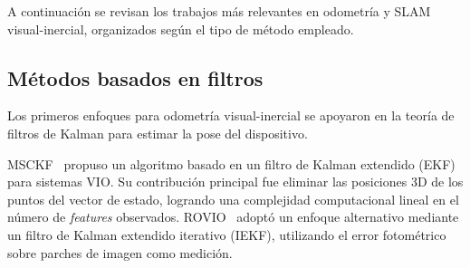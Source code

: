 


A continuación se revisan los trabajos más relevantes en odometría y SLAM visual-inercial, organizados según el tipo de método empleado.

\subsection{Métodos basados en filtros}

Los primeros enfoques para odometría visual-inercial se apoyaron en la teoría de filtros de Kalman para estimar la pose del dispositivo.

MSCKF~\cite{mourikis2007msckf} propuso un algoritmo basado en un filtro de Kalman extendido (EKF) para sistemas VIO. Su contribución principal fue eliminar las posiciones 3D de los puntos del vector de estado, logrando una complejidad computacional lineal en el número de \textit{features} observados.
ROVIO~\cite{bloesch2015rovio} adoptó un enfoque alternativo mediante un filtro de Kalman extendido iterativo (IEKF), utilizando el error fotométrico sobre parches de imagen como medición.


